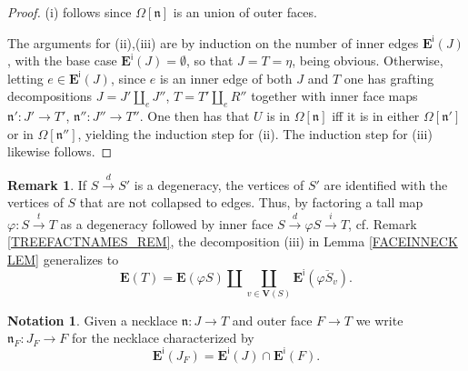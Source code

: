 \documentclass[a4paper,10pt]{article}%
\numberwithin{equation}{section}
\numberwithin{figure}{section}
\theoremstyle{definition} %
\newtheorem{remark}[equation]{Remark}%
\newtheorem{notation}[equation]{Notation}%
\begin{document}
\begin{proof}
	(i) follows since $\Omega[\mathfrak{n}]$ is an union of outer faces.
	
	The arguments for (ii),(iii) are by induction on the number of inner edges $\boldsymbol{E}^{\mathsf{i}}(J)$,
	with the base case $\boldsymbol{E}^{\mathsf{i}}(J) = \emptyset$,
	so that $J=T=\eta$,
	being obvious.
%	
	Otherwise, letting $e \in \boldsymbol{E}^{\mathsf{i}}(J)$, since $e$ is an inner edge of
	both $J$ and $T$
	one has grafting decompositions
	$J = J' \amalg_e J''$,
	$T = T' \amalg_e R''$
	together with inner face maps
	$\mathfrak{n}' \colon J' \to T'$,
	$\mathfrak{n}'' \colon J'' \to T''$.
%
	One then has that 
	$U$ is in $\Omega[\mathfrak{n}]$
	iff it is in either
	$\Omega[\mathfrak{n}']$ or in $\Omega[\mathfrak{n}'']$,
	yielding the induction step for (ii).
	The induction step for (iii) likewise follows. 
\end{proof}



\begin{remark}
	If $S \xrightarrow{d} S'$
	is a degeneracy,
	the vertices of $S'$ are identified with
	the vertices of $S$ that are not collapsed to edges.
	Thus, by factoring a tall map
	$\varphi \colon S \xrightarrow{t} T$ as
	a degeneracy followed by inner face
	$S \xrightarrow{d} \varphi S \xrightarrow{i} T$,
	cf. Remark \ref{TREEFACTNAMES_REM},
	the decomposition (iii) in Lemma \ref{FACEINNECK LEM}
	generalizes to 
\begin{equation}\label{EDGEBREAK EQ}
	\boldsymbol{E}(T) = 
	\boldsymbol{E}(\varphi S) \amalg 
	\coprod_{v \in \boldsymbol{V}(S)}
	\boldsymbol{E}^{\mathsf{i}}(\overline{\varphi S_v}).
\end{equation}
\end{remark}



\begin{notation}\label{JFNOT NOT}
	Given a necklace
	$\mathfrak{n} \colon J \to T$
	and outer face $F \to T$
	we write 
	$\mathfrak{n}_F \colon J_F \to F$
	for the necklace characterized by
\[
	\boldsymbol{E}^{\mathsf{i}}(J_F)
	=
	\boldsymbol{E}^{\mathsf{i}}(J)
	\cap
	\boldsymbol{E}^{\mathsf{i}}(F).
\]
\end{notation}
\end{document}
